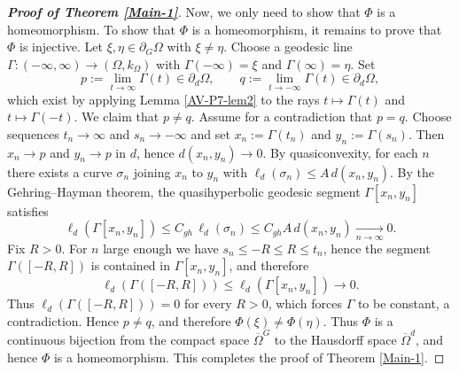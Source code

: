 \documentclass[a4paper,12pt]{amsart}
\theoremstyle{definition}
\begin{document}
\begin{proof}[\textbf{Proof of Theorem \ref{Main-1}}]
	Now, we only need to show that $\Phi$ is a homeomorphism. To show that $\Phi$ is a homeomorphism, it remains to prove that $\Phi$ is injective. Let $\xi,\eta\in\partial_G\Omega$ with $\xi\neq\eta$.
		Choose a geodesic line $\Gamma:(-\infty,\infty)\to(\Omega,k_\Omega)$ with
		$\Gamma(-\infty)=\xi$ and $\Gamma(\infty)=\eta$.
		Set
		\[
		p:=\lim_{t\to\infty}\Gamma(t)\in\partial_d\Omega,
		\qquad
		q:=\lim_{t\to-\infty}\Gamma(t)\in\partial_d\Omega,
		\]
		which exist by applying Lemma \ref{AV-P7-lem2} to the rays $t\mapsto\Gamma(t)$ and $t\mapsto\Gamma(-t)$.
		We claim that $p\neq q$. Assume for a contradiction that $p=q$.
		Choose sequences $t_n\to\infty$ and $s_n\to-\infty$ and set $x_n:=\Gamma(t_n)$ and $y_n:=\Gamma(s_n)$.
		Then $x_n\to p$ and $y_n\to p$ in $d$, hence $d(x_n,y_n)\to0$.
		By quasiconvexity, for each $n$ there exists a curve $\sigma_n$ joining $x_n$ to $y_n$ with
		$\ell_d(\sigma_n)\le A\,d(x_n,y_n)$.
		By the Gehring--Hayman theorem, the quasihyperbolic geodesic segment $\Gamma[x_n,y_n]$ satisfies
		\[
		\ell_d(\Gamma[x_n,y_n])\le C_{gh}\,\ell_d(\sigma_n)\le C_{gh}A\,d(x_n,y_n)\xrightarrow[n\to\infty]{}0.
		\]
		Fix $R>0$. For $n$ large enough we have $s_n\le -R\le R\le t_n$, hence the segment $\Gamma([-R,R])$
		is contained in $\Gamma[x_n,y_n]$, and therefore
		\[
		\ell_d(\Gamma([-R,R]))\le \ell_d(\Gamma[x_n,y_n])\to0.
		\]
		Thus $\ell_d(\Gamma([-R,R]))=0$ for every $R>0$, which forces $\Gamma$ to be constant, a contradiction.
		Hence $p\neq q$, and therefore $\Phi(\xi)\neq\Phi(\eta)$. Thus $\Phi$ is a continuous bijection from the compact space $\overline{\Omega}^G$ to the Hausdorff space $\overline{\Omega}^d$,
	and hence $\Phi$ is a homeomorphism. This completes the proof of Theorem \ref{Main-1}.
\end{proof}



	
\end{document}
